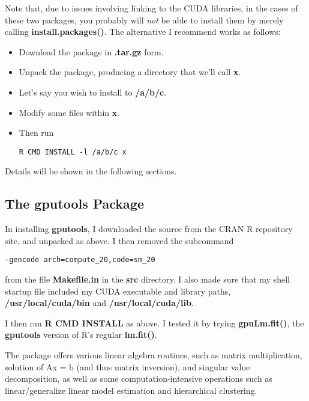 Note that, due to issues involving linking to the CUDA libraries, in
the cases of these two packages, you probably will {\it not} be able to
install them by merely calling {\bf install.packages()}.   The
alternative I recommend works as follows:

\begin{itemize}

\item Download the package in {\bf .tar.gz} form.

\item Unpack the package, producing a directory that we'll call {\bf x}.

\item Let's say you wish to install to {\bf /a/b/c}.

\item Modify some files within {\bf x}.

\item Then run

\begin{lstlisting}
R CMD INSTALL -l /a/b/c x
\end{lstlisting}

\end{itemize}

Details will be shown in the following sections.

\subsection{The gputools Package}

In installing {\bf gputools}, I downloaded the source from the CRAN R
repository site, and unpacked as above.  I then removed the subcommand

\begin{verbatim}
-gencode arch=compute_20,code=sm_20
\end{verbatim}

from the file {\bf Makefile.in} in the {\bf src} directory.  I also
made sure that my shell startup file included my CUDA executable and
library paths, {\bf /usr/local/cuda/bin} and {\bf /usr/local/cuda/lib}.

I then ran {\bf R CMD INSTALL} as above.  I tested it by trying
{\bf gpuLm.fit()}, the {\bf gputools} version of R's regular {\bf
lm.fit()}.

The package offers various linear algebra routines, such as matrix
multiplication, solution of Ax = b (and thus matrix inversion), and
singular value decomposition, as well as some computation-intensive
operations such as linear/generalize linear model estimation and
hierarchical clustering.


